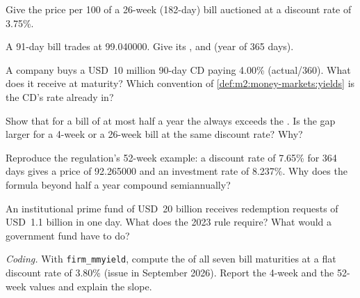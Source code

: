 \begin{exercise}[$\star$]\label{exo:m2:money-markets:1}
Give the price per 100 of a 26-week (182-day) bill auctioned at a discount
rate of 3.75\%.
\end{exercise}

\begin{exercise}[$\star$]\label{exo:m2:money-markets:2}
A 91-day bill trades at 99.040000. Give its ,  and  (year of 365 days).
\end{exercise}

\begin{exercise}[$\star$]\label{exo:m2:money-markets:3}
A company buys a USD~10 million 90-day CD paying 4.00\% (actual/360). What
does it receive at maturity? Which convention of
\cref{def:m2:money-markets:yields} is the CD's rate already in?
\end{exercise}

\begin{exercise}[$\star\star$]\label{exo:m2:money-markets:4}
Show that for a bill of at most half a year the  always
exceeds the . Is the gap larger for a 4-week or a 26-week bill
at the same discount rate? Why?
\end{exercise}

\begin{exercise}[$\star\star$]\label{exo:m2:money-markets:5}
Reproduce the regulation's 52-week example: a discount rate of 7.65\% for
364 days gives a price of 92.265000 and an investment rate of 8.237\%. Why
does the formula beyond half a year compound semiannually?
\end{exercise}

\begin{exercise}[$\star\star$]\label{exo:m2:money-markets:6}
An institutional prime fund of USD~20 billion receives redemption requests of
USD~1.1 billion in one day. What does the 2023 rule require? What would a
government fund have to do?
\end{exercise}

\begin{exercise}[$\star\star\star$]\label{exo:m2:money-markets:7}
\emph{Coding.} With \texttt{firm\_mmyield}, compute the 
of all seven bill maturities at a flat discount rate of 3.80\% (issue in
September 2026). Report the 4-week and the 52-week values and explain the
slope.
\end{exercise}

